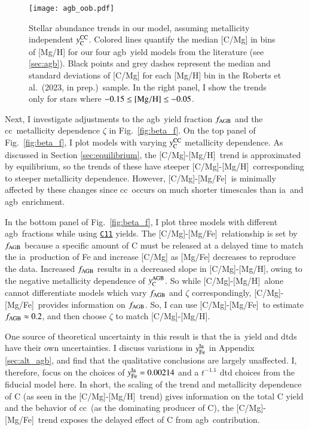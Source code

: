 \documentclass[12pt,oneside,letterpaper]{report}
\newcommand{\cc}{\gls{cc}}
\newcommand{\agb}{\gls{agb}}
\newcommand{\ia}{\gls{ia}}
\newcommand{\citetjack}{Roberts et al.~(2023, in prep.)}
\newcommand{\cxi}{\texttt{\hyperlink{C11}{C11}}}
\newcommand{\caah}{[C/Mg]-[Mg/H]}
\newcommand{\caafe}{[C/Mg]-[Mg/Fe]}
\newcommand{\Ycc}{\ensuremath{y_{\rm C}^{\rm CC}}}
\newcommand{\Ycagb}{\ensuremath{y_{\rm C}^{\rm AGB}}}
\begin{document}
\begin{figure}[htp]
\centering
\texttt{[image: agb\_oob.pdf]}
\caption[Median Stellar Abundance Trends]{
    Stellar abundance trends in our model, assuming metallicity independent $\Ycc$. Colored lines quantify the median [C/Mg] in bins of [Mg/H] for our four \agb\ yield models from the literature (see \ref{sec:agb}). Black points and grey dashes represent the median and standard deviations of [C/Mg] for each [Mg/H] bin in the \citetjack~sample. In the right panel, I show the trends only for stars where $-0.15\leq {\rm [Mg/H]}\leq -0.05$.
}
\label{fig:agb_sims}
\end{figure}


Next, I investigate adjustments to the \agb\ yield fraction $f_{\rm AGB}$ and the \cc\ metallicity dependence $\zeta$ in Fig.~\ref{fig:beta_f}. On the top panel of Fig.~\ref{fig:beta_f}, I plot models with varying $\Ycc$ metallicity dependence. As discussed in Section \ref{sec:equilibrium}, the \caah~trend is approximated by equilibrium, so the trends of these have steeper \caah~corresponding to steeper metallicity dependence. However, \caafe~is minimally affected by these changes since \cc\ occurs on much shorter timescales than \ia\ and \agb\ enrichment.

In the bottom panel of Fig.~\ref{fig:beta_f}, I plot three models with different \agb\ fractions while using \cxi{} yields.  The \caafe~relationship is set by $f_{\rm AGB}$ because a specific amount of C must be released at a delayed time to match the \ia\ production of Fe and increase [C/Mg] as [Mg/Fe] decreases to reproduce the data.
Increased $f_{\rm AGB}$ results in a decreased slope in \caah, owing to the negative metallicity dependence of $\Ycagb$. So while \caah~alone cannot differentiate models which vary $f_{\rm AGB}$ and $\zeta$ correspondingly, \caafe~provides information on $f_{\rm AGB}$. So, I can use \caafe~to estimate $f_{\rm AGB}\approx 0.2$, and then choose $\zeta$ to match \caah.

One source of theoretical uncertainty in this result is that the \ia\ yield and \gls{dtd}s have their own uncertainties. I discuss variations in $y_{\rm Fe}^{\rm Ia}$ in Appendix \ref{sec:alt_agb}, and find that the qualitative conclusions are largely unaffected. I, therefore, focus on the choices of $y_{\rm Fe}^{\rm Ia} = 0.00214$ and a $t^{-1.1}$ \gls{dtd} choices from the fiducial model here.
In short, the scaling of the trend and metallicity dependence of C (as seen in
the \caah\ trend) gives information on the total C yield and the behavior of \cc\ (as the dominating producer of C), the \caafe\ trend exposes the delayed effect of C from \agb\ contribution.
\end{document}
